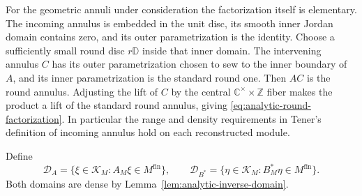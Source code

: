 For the geometric annuli under consideration the factorization itself
is elementary.  The incoming annulus is embedded in the unit disc,
its smooth inner Jordan domain contains zero, and its outer
parametrization is the identity.  Choose a sufficiently small round
disc $r\mathbb D$ inside that inner domain.  The intervening annulus
$C$ has its outer parametrization chosen to sew to the inner boundary
of $A$, and its inner parametrization is the standard round one.
Then $AC$ is the round annulus.  Adjusting the lift of $C$ by the
central $\mathbb C^\times\times\mathbb Z$ fiber makes the product
a lift of the standard round annulus, giving
\eqref{eq:analytic-round-factorization}.  In particular the range and
density requirements in Tener's definition of incoming annulus
\cite[Definition~4.2]{TenFields} hold on each reconstructed module.

Define
\begin{equation}
 \mathcal D_A=\{\xi\in\mathcal K_M:A_M\xi\in M^{\mathrm{fin}}\},
 \qquad
 \mathcal D_{B^*}=\{\eta\in\mathcal K_M:B_M^*\eta\in M^{\mathrm{fin}}\}.
\label{eq:analytic-annulus-domains}
\end{equation}
Both domains are dense by Lemma~\ref{lem:analytic-inverse-domain}.

